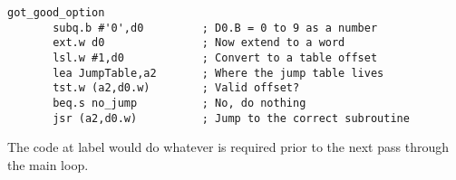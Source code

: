 \begin{lstlisting}[firstnumber=1,caption={Processing User Options - Jump Tables}]
got_good_option
       subq.b #'0',d0         ; D0.B = 0 to 9 as a number
       ext.w d0               ; Now extend to a word
       lsl.w #1,d0            ; Convert to a table offset
       lea JumpTable,a2       ; Where the jump table lives
       tst.w (a2,d0.w)        ; Valid offset?
       beq.s no_jump          ; No, do nothing
       jsr (a2,d0.w)          ; Jump to the correct subroutine
\end{lstlisting}

The code at label  would do whatever is required prior to the next pass through the main loop.
